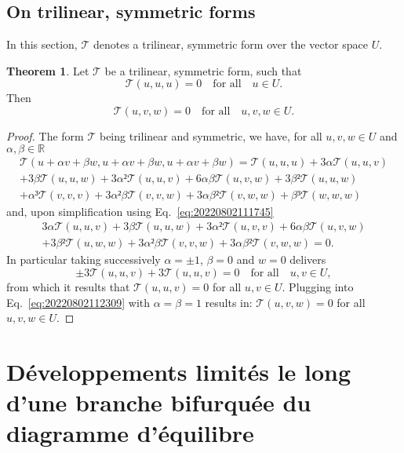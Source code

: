 \documentclass[12pt, final]{scrartcl}
\theoremstyle{definition}
\newtheorem{theorem}{Theorem}
\begin{document}
\subsection{On trilinear, symmetric forms}

In this section, \(𝒯\) denotes a trilinear, symmetric form over the vector space
\(U\).

\begin{theorem}
  \label{thr:20220802112835}
  Let \(𝒯\) be a trilinear, symmetric form, such that
  \begin{equation}
    \label{eq:20220802111745}
    𝒯(u, u, u) = 0 \quad \text{for all} \quad u ∈ U.
  \end{equation}
  Then
  \begin{equation}
    𝒯(u, v, w) = 0 \quad \text{for all} \quad u, v, w ∈ U.
  \end{equation}
\end{theorem}
\begin{proof}
  The form \(𝒯\) being trilinear and symmetric, we have, for all \(u, v, w ∈ U\)
  and \(α, β ∈ ℝ\)
  \begin{multline*}
    𝒯(u + αv + βw, u + αv + βw, u + αv + βw) = 𝒯(u, u, u) + 3α 𝒯(u, u, v)\\
    + 3β 𝒯(u, u, w) + 3α² 𝒯(u, u, v) + 6 α β 𝒯(u, v, w) + 3 β² 𝒯(u, u, w)\\
    + α³ 𝒯(v, v, v) + 3 α² β 𝒯(v, v, w) + 3 α β² 𝒯(v, w, w) + β³ 𝒯(w, w, w)
  \end{multline*}
  and, upon simplification using Eq.~\eqref{eq:20220802111745}
  \begin{multline}
    \label{eq:20220802112309}
    3α 𝒯(u, u, v) + 3β 𝒯(u, u, w) + 3α² 𝒯(u, v, v) + 6 α β 𝒯(u, v, w)\\
    + 3 β² 𝒯(u, w, w) + 3 α² β 𝒯(v, v, w) + 3 α β² 𝒯(v, w, w) = 0.
  \end{multline}
  In particular taking successively \(α = ±1\), \(β = 0\) and \(w = 0\) delivers
  \begin{equation*}
    ±3 𝒯(u, u, v) + 3 𝒯(u, u, v) = 0 \quad \text{for all} \quad u, v ∈ U,
  \end{equation*}
  from which it results that \(𝒯(u, u, v) = 0\) for all \(u, v ∈ U\). Plugging
  into Eq.~\eqref{eq:20220802112309} with \(α = β = 1\) results in:
  \(𝒯(u, v, w) = 0\) for all \(u, v, w ∈ U\).
\end{proof}

\section{Développements limités le long d'une branche bifurquée du diagramme d'équilibre}
\end{document}
